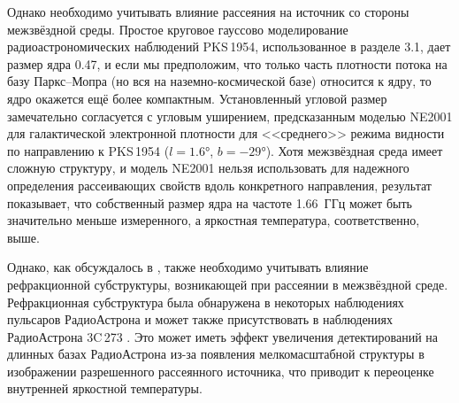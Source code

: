 Однако необходимо учитывать влияние рассеяния на источник со стороны межзвёздной среды. Простое
круговое гауссово моделирование радиоастрономических наблюдений PKS\,1954,
использованное в разделе 3.1, дает размер ядра \SI{0.47}{\mas}, и если мы предположим, что только
часть плотности потока на базу Паркс--Мопра (но вся на наземно-космической базе) относится к ядру,
то ядро окажется ещё более компактным. Установленный угловой размер замечательно согласуется с
угловым уширением, предсказанным моделью NE2001 для галактической электронной плотности
\cite{Cordes_2002} для <<среднего>> режима видности \cite{Goodman_1989,Taylor_1993} по направлению к
PKS\,1954 ($l = \ang{1.6}$, $b = \ang{-29}$). Хотя межзвёздная среда имеет сложную
структуру, и модель NE2001 нельзя использовать для надежного определения рассеивающих свойств вдоль
конкретного направления, результат показывает, что собственный размер ядра на частоте 1.66~ГГц может
быть значительно меньше измеренного, а яркостная температура, соответственно, выше.

Однако, как обсуждалось в \cite{Johnson_2015}, также необходимо учитывать влияние рефракционной
субструктуры, возникающей при рассеянии в межзвёздной среде. Рефракционная субструктура была
обнаружена в некоторых наблюдениях пульсаров РадиоАстрона \cite{Gwinn_2016,Popov_2017} и может также
присутствовать в наблюдениях РадиоАстрона 3C\,273 \cite{Johnson_2016}. Это может иметь эффект
увеличения детектирований на длинных базах РадиоАстрона из-за появления мелкомасштабной структуры в
изображении разрешенного рассеянного источника, что приводит к переоценке внутренней яркостной
температуры.

